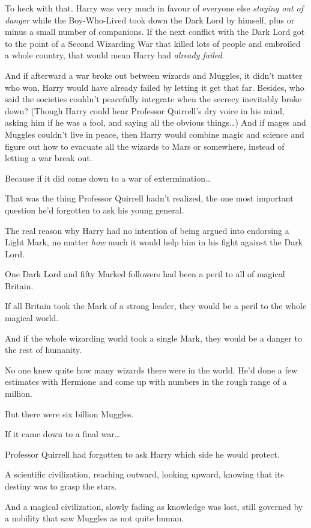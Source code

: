 To heck with that. Harry was very much in favour of everyone else \emph{staying
out of danger} while the Boy-Who-Lived took down the Dark Lord by himself, plus
or minus a small number of companions. If the next conflict with the Dark Lord
got to the point of a Second Wizarding War that killed lots of people and
embroiled a whole country, that would mean Harry had \emph{already failed}.

And if afterward a war broke out between wizards and Muggles, it didn’t matter
who won, Harry would have already failed by letting it get that far. Besides,
who said the societies couldn’t peacefully integrate when the secrecy
inevitably broke down? (Though Harry could hear Professor Quirrell’s dry voice
in his mind, asking him if he was a fool, and saying all the obvious
things…) And if mages and Muggles couldn’t live in peace, then Harry
would combine magic and science and figure out how to evacuate all the wizards
to Mars or somewhere, instead of letting a war break out.

Because if it did come down to a war of extermination…

That was the thing Professor Quirrell hadn’t realized, the one most important
question he’d forgotten to ask his young general.

The real reason why Harry had no intention of being argued into endorsing a
Light Mark, no matter \emph{how} much it would help him in his fight against
the Dark Lord.

One Dark Lord and fifty Marked followers had been a peril to all of magical
Britain.

If all Britain took the Mark of a strong leader, they would be a peril to the
whole magical world.

And if the whole wizarding world took a single Mark, they would be a danger to
the rest of humanity.

No one knew quite how many wizards there were in the world. He’d done a few
estimates with Hermione and come up with numbers in the rough range of a
million.

But there were six billion Muggles.

If it came down to a final war…

Professor Quirrell had forgotten to ask Harry which side he would protect.

A scientific civilization, reaching outward, looking upward, knowing that its
destiny was to grasp the stars.

And a magical civilization, slowly fading as knowledge was lost, still governed
by a nobility that saw Muggles as not quite human.

